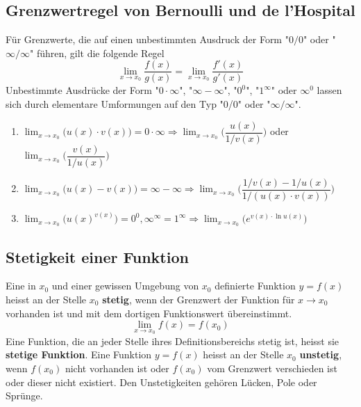 \subsection{Grenzwertregel von Bernoulli und de l'Hospital}
Für Grenzwerte, die auf einen unbestimmten Ausdruck der Form "$0/0$" oder "$\infty/\infty$" führen, gilt die folgende Regel
\begin{equation}
\boxed{\displaystyle \lim_{x\rightarrow x_0}\dfrac{f\left(x\right)}{g\left(x\right)}=\lim_{x\rightarrow x_0}\dfrac{f'\left(x\right)}{g'\left(x\right)}}
\end{equation}
Unbestimmte Ausdrücke der Form "$0\cdot \infty$", "$\infty-\infty$", "$0^0$", "$1^{\infty}$" oder $\infty^0$ lassen sich durch elementare Umformungen auf den Typ "0/0" oder "$\infty/\infty$".
\begin{enumerate}[$(i)$]
\item $\displaystyle \lim_{x\rightarrow x_0} \Big(u\left(x\right)\cdot v\left(x\right)\Big)=0\cdot \infty \Longrightarrow \displaystyle \lim_{x\rightarrow x_0} \Big(\dfrac{u\left(x\right)}{1/v\left(x\right)}\Big)$ oder $\displaystyle \lim_{x\rightarrow x_0} \Big(\dfrac{v\left(x\right)}{1/u\left(x\right)}\Big)$
\item $\displaystyle \lim_{x\rightarrow x_0} \Big(u\left(x\right)-v\left(x\right)\Big)=\infty-\infty\Longrightarrow \displaystyle \lim_{x\rightarrow x_0}\Big(\dfrac{1/v\left(x\right)-1/u\left(x\right)}{1/\left(u\left(x\right)\cdot v\left(x\right)\right)}\Big)$
\item $\displaystyle \lim_{x\rightarrow x_0}\Big(u\left(x\right)^{v\left(x\right)}\Big)=0^0, \infty^{\infty}=1^{\infty}\Longrightarrow \displaystyle \lim_{x\rightarrow x_0}\Big(e^{v\left(x\right)\cdot \ln u\left(x\right)}\Big)$ 
\end{enumerate}
\subsection{Stetigkeit einer Funktion}
Eine in $x_0$ und einer gewissen Umgebung von $x_0$ definierte Funktion $y=f\left(x\right)$ heisst an der Stelle $x_0$ \textbf{stetig}, wenn der Grenzwert der Funktion für $x\rightarrow x_0$ vorhanden ist und mit dem dortigen Funktionswert übereinstimmt. 
\begin{equation}
\boxed{\displaystyle \lim_{x\rightarrow x_0}f\left(x\right)=f\left(x_0\right)}
\end{equation}
Eine Funktion, die an jeder Stelle ihres Definitionsbereichs stetig ist, heisst sie \textbf{stetige Funktion}. Eine Funktion $y=f\left(x\right)$ heisst an der Stelle $x_0$ \textbf{unstetig}, wenn $f\left(x_0\right)$ nicht vorhanden ist oder $f\left(x_0\right)$ vom Grenzwert verschieden ist oder dieser nicht existiert. Den Unstetigkeiten gehören Lücken, Pole oder Sprünge.  
